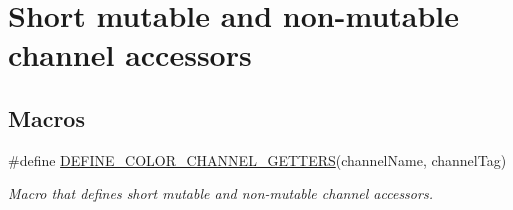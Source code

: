\hypertarget{group___channel_accessors}{\section{Short mutable and non-\/mutable channel accessors}
\label{group___channel_accessors}
}
\subsection*{Macros}
\begin{DoxyCompactItemize}
\item 
\#define \hyperlink{group___channel_accessors_ga17a132ee4905c132201008787b93e336}{D\-E\-F\-I\-N\-E\-\_\-\-C\-O\-L\-O\-R\-\_\-\-C\-H\-A\-N\-N\-E\-L\-\_\-\-G\-E\-T\-T\-E\-R\-S}(channel\-Name, channel\-Tag)
\begin{DoxyCompactList}\small\item\em Macro that defines short mutable and non-\/mutable channel accessors. \end{DoxyCompactList}\end{DoxyCompactItemize}
